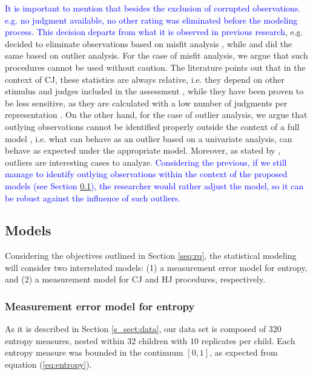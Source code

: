 \textcolor{blue}{It is important to mention that besides the exclusion of corrupted observations. e.g. no judgment available, no other rating was eliminated before the modeling process. This decision departs from what it is observed in previous research}, e.g. \citet{Boonen_et_al_2020} decided to eliminate observations based on misfit analysis \citep{Lesterhuis_2018}, while \citet{vanDaal_2020} and \citet{Boonen_et_al_2021} did the same based on outlier analysis. For the case of misfit analysis, we argue that such procedures cannot be used without caution. The literature points out that in the context of CJ, these statistics are always relative, i.e. they depend on other stimulus and judges included in the assessment \citep{Pollitt_2012a, Pollitt_2012b}, while they have been proven to be less sensitive, as they are calculated with a low number of judgments per representation \citep{Pollitt_2012a}. On the other hand, for the case of outlier analysis, we argue that outlying observations cannot be identified properly outside the context of a full model \citep{McElreath_2020}, i.e. what can behave as an outlier based on a univariate analysis, can behave as expected under the appropriate model. Moreover, as stated by \citet{McElreath_2020}, outliers are interesting cases to analyze. \textcolor{blue}{Considering the previous, if we still manage to identify outlying observations within the context of the proposed models (see Section \ref{s_sect:models}), the researcher would rather adjust the model, so it can be robust against the influence of such outliers.}
%
%
\subsection{Models} \label{s_sect:models}
%
Considering the objectives outlined in Section \ref{seq:rq}, the statistical modeling will consider two interrelated models: (1) a measurement error model for entropy, and (2) a measurement model for CJ and HJ procedures, respectively.
%
\subsubsection{Measurement error model for entropy}
%
As it is described in Section \ref{s_sect:data}, our data set is composed of $320$ entropy measures, nested within $32$ children with $10$ replicates per child. Each entropy measure was bounded in the continuum $[0,1]$, as expected from equation (\ref{eq:entropy}).

